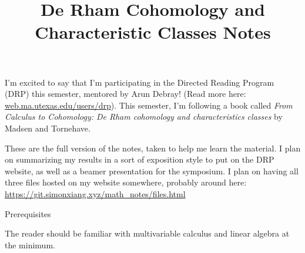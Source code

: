 \documentclass[fontsize=9pt]{article}
\title{De Rham Cohomology and Characteristic Classes Notes}
\begin{document}
\maketitle
I'm excited to say that I'm participating in the Directed Reading Program (DRP) this semester, mentored by Arun Debray! (Read more here: \url{web.ma.utexas.edu/users/drp}). This semester, I'm following a book called \emph{From Calculus to Cohomology: De Rham cohomology and characteristics classes} by Madsen and Tornehave. 

These are the full version of the notes, taken to help me learn the material. I plan on summarizing my results in a sort of exposition style to put on the DRP website, as well as a beamer presentation for the symposium. I plan on having all three files hosted on my website somewhere, probably around here: \url{https://git.simonxiang.xyz/math_notes/files.html}

\begin{center}
    \large\sc Prerequisites
\end{center}
The reader should be familiar with multivariable calculus and linear algebra at the minimum.
\tableofcontents
    
\end{document}

